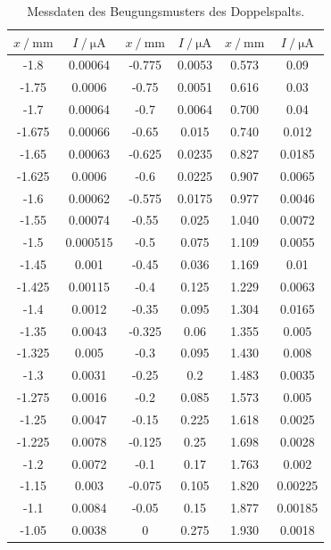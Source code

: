 \begin{table}
\centering
\caption{Messdaten des Beugungsmusters des Doppelspalts.}
\label{tab:doppel}
\begin{tabular}{c c c c c c}
\toprule
$x\:/\: \si{\milli\meter}$ & $I\:/\: \si{\micro\ampere}$ &
$x\:/\: \si{\milli\meter}$ & $I\:/\: \si{\micro\ampere}$ &
$x\:/\: \si{\milli\meter}$ & $I\:/\: \si{\micro\ampere}$ \\
\midrule
-1.8   & 0.00064  & -0.775 & 0.0053   & 0.573   & 0.09\\
-1.75  & 0.0006   & -0.75  & 0.0051   & 0.616   & 0.03\\
-1.7   & 0.00064  & -0.7   & 0.0064   & 0.700   & 0.04\\
-1.675 & 0.00066  & -0.65  & 0.015    & 0.740   & 0.012 \\
-1.65  & 0.00063  & -0.625 & 0.0235   & 0.827   & 0.0185 \\
-1.625 & 0.0006   & -0.6   & 0.0225   & 0.907   & 0.0065 \\
-1.6   & 0.00062  & -0.575 & 0.0175   & 0.977   & 0.0046 \\
-1.55  & 0.00074  & -0.55  & 0.025    & 1.040   & 0.0072 \\
-1.5   & 0.000515 & -0.5   & 0.075    & 1.109   & 0.0055 \\
-1.45  & 0.001    & -0.45  & 0.036    & 1.169   & 0.01 \\
-1.425 & 0.00115  & -0.4   & 0.125    & 1.229   & 0.0063 \\
-1.4   & 0.0012   & -0.35  & 0.095    & 1.304   & 0.0165 \\
-1.35  & 0.0043   & -0.325 & 0.06     & 1.355   & 0.005 \\
-1.325 & 0.005    & -0.3   & 0.095    & 1.430   & 0.008 \\
-1.3   & 0.0031   & -0.25  & 0.2      & 1.483   & 0.0035 \\
-1.275 & 0.0016   & -0.2   & 0.085    & 1.573   & 0.005 \\
-1.25  & 0.0047   & -0.15  & 0.225    & 1.618   & 0.0025 \\
-1.225 & 0.0078   & -0.125 & 0.25     & 1.698   & 0.0028 \\
-1.2   & 0.0072   & -0.1   & 0.17     & 1.763   & 0.002 \\
-1.15  & 0.003    & -0.075 & 0.105    & 1.820   & 0.00225 \\
-1.1   & 0.0084   & -0.05  & 0.15     & 1.877   & 0.00185 \\
-1.05  & 0.0038   & 0      & 0.275    & 1.930   & 0.0018 \\

\end{tabular}
\end{table}
